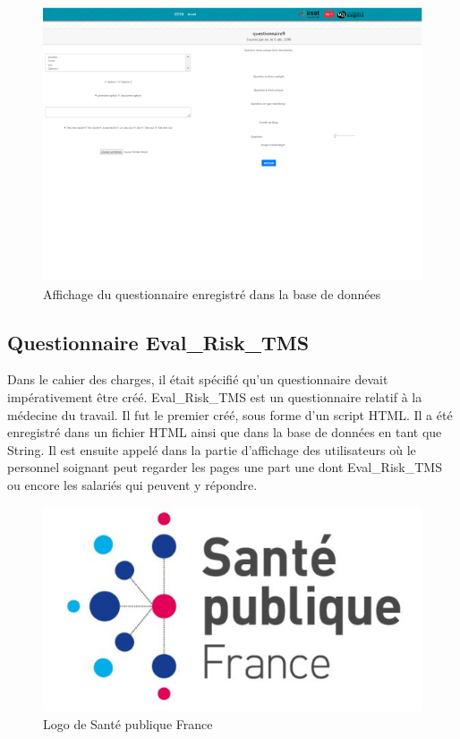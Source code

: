 \begin{figure}[H]
    \begin{center}
	\includegraphics[scale=0.7]{img/questionnaire/affichage}
    \end{center}
    \caption{Affichage du questionnaire enregistré dans la base de données}
\end{figure}

\subsection{Questionnaire Eval\_Risk\_TMS}

Dans le cahier des charges, il était spécifié qu'un questionnaire devait impérativement être créé. Eval\_Risk\_TMS est un questionnaire relatif à la médecine du travail. Il fut le premier créé, sous forme d'un script HTML. Il a été enregistré dans un fichier HTML ainsi que dans la base de données en tant que String.
Il est ensuite appelé dans la partie d'affichage des utilisateurs où le personnel soignant peut regarder les pages une part une dont Eval\_Risk\_TMS ou encore les salariés qui peuvent y répondre.

\begin{figure}[H]
    \begin{center}
	\includegraphics[scale=0.4]{img/Sante}
    \end{center}
    \caption{Logo de Santé publique France}
\end{figure}